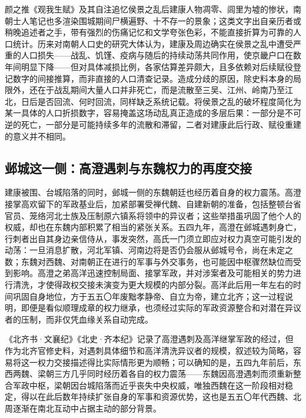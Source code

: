 \begin{debate}
颜之推《观我生赋》及其自注追忆侯景之乱后建康人物凋零、闾里为墟的惨状，南朝士人笔记也多渲染围城期间尸横遍野、十不存一的景象；这类文字出自亲历者或稍晚追述者之手，带有强烈的伤痛记忆和文学夸张色彩，不能直接折算为可靠的人口统计。历来对南朝人口史的研究大体认为，建康及周边确实在侯景之乱中遭受严重的人口损失——战乱、饥馑、疫病与随后的持续动荡共同作用，使京畿户口在数年间明显下降——但对具体减损比例，各家估算差异颇大，且多依赖对后续赋役登记数字的间接推算，而非直接的人口清查记录。造成分歧的原因，除史料本身的局限外，还在于战乱期间大量人口并非死亡，而是流散至三吴、江州、岭南乃至江北，日后是否回流、何时回流，同样缺乏系统记载。将侯景之乱的破坏程度简化为某一具体的人口折损数字，容易掩盖这场动乱真正造成的多层后果：一部分是不可逆的死亡，一部分是可能持续多年的流散和滞留，二者对建康此后行政、赋役重建的意义并不相同。
\end{debate}

\subsection{邺城这一侧：高澄遇刺与东魏权力的再度交接}

建康被围、台城陷落的同时，邺城一侧的东魏朝廷也经历着自身的权力震荡。高澄接掌高欢留下的军政基业后，加紧部署受禅代魏、自建新朝的准备，包括整顿台省官员、笼络河北士族及压制原六镇系将领中的异议者；这些举措虽巩固了他个人的权威，却也在东魏内部积累了相当的紧张关系。五四九年，高澄在邺城遇刺身亡，行刺者出自其身边亲信侍从，事发突然，高氏一门须立即应对权力真空可能引发的动荡：一旦消息扩散，河北军镇、河南边将是否仍会服从邺城号令，尚在未定之数；东魏对西魏、对南朝正在进行的军事与外交事务，也可能因中枢骤然缺位而受到影响。高澄之弟高洋迅速控制局面、接掌军政，并对涉案者及可能相关的势力进行清洗，才使得政权交接未演变为更大规模的内部分裂。高洋此后用一年左右的时间巩固自身地位，方于五五〇年废黜孝静帝、自立为帝，建立北齐；这一过程说明，即便是看似顺理成章的权力继承，也须经过实际的军政资源整合和对潜在异议者的压制，而非仅凭血缘关系自动完成。

《北齐书·文襄纪》《北史·齐本纪》记录了高澄遇刺及高洋继掌军政的经过，但作为北齐官修史料，对遇刺具体细节和高洋清洗异议者的规模，叙述较为简略，容易将这一权力交接描述得比实际情形更为顺畅；可以确知的是，五四九年前后，东西两魏、梁朝三方几乎同时经历着各自的权力震荡——东魏因高澄遇刺而须重新整合军政中枢，梁朝因台城陷落而近乎丧失中央权威，唯独西魏在这一阶段相对稳定，得以在此后数年持续扩张自身的军事和资源优势，这也是五五〇年代西魏、北周逐渐在南北互动中占据主动的部分背景。

